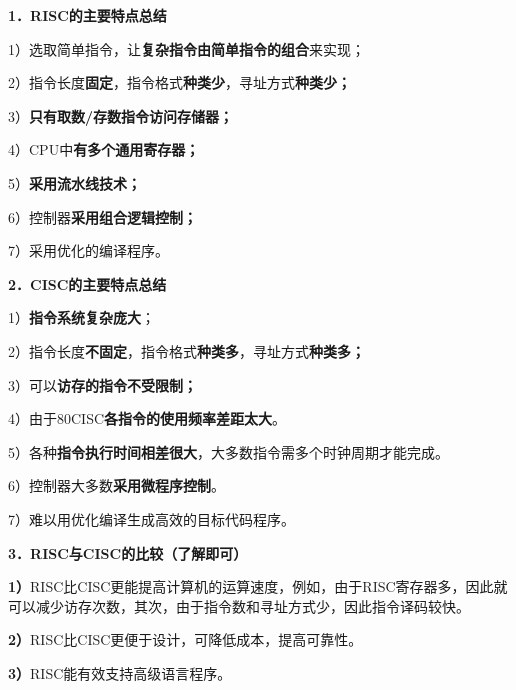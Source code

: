 \textbf{1．RISC的主要特点总结}

{1）}{选取简单指令，让\textbf{复杂指令由简单指令的组合}来实现；}

{2）}{指令长度\textbf{固定}，指令格式\textbf{种类少}，寻址方式\textbf{种类少；}}

{3）}{\textbf{只有取数/存数指令访问存储器；}}

{4）}{CPU中\textbf{有多个通用寄存器；}}

{5）}{\textbf{采用流水线技术；}}

{6）}{控制器\textbf{采用组合逻辑控制；}}

{7）}{采用优化的编译程序。}

{\textbf{2．CISC的主要特点总结}}

1）\textbf{指令系统复杂庞大}；

2）指令长度\textbf{不固定}，指令格式\textbf{种类多}，寻址方式\textbf{种类多；}

3）可以\textbf{访存的指令不受限制；}

4）由于80CISC\textbf{各指令的使用频率差距太大}。

5）各种\textbf{指令执行时间相差很大}，大多数指令需多个时钟周期才能完成。

6）控制器大多数\textbf{采用微程序控制}。

7）难以用优化编译生成高效的目标代码程序。

{\textbf{3．RISC与CISC的比较（了解即可）}}

\textbf{1）}RISC比CISC更能提高计算机的运算速度，例如，由于RISC寄存器多，因此就可以减少访存次数，其次，由于指令数和寻址方式少，因此指令译码较快。

\textbf{2）}RISC比CISC更便于设计，可降低成本，提高可靠性。

\textbf{3）}RISC能有效支持高级语言程序。\\

